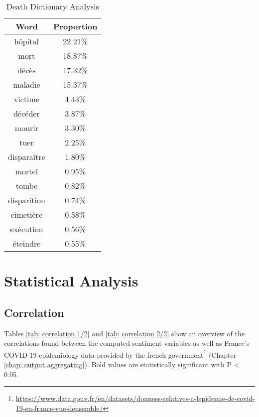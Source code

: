 \begin{table}[]
\caption{Death Dictionary Analysis}
\label{tab:death freqs}
\centering
\begin{tabular}{@{}cc@{}}
\toprule
Word      & Proportion \\ \midrule
hôpital     & 22.21\% \\
mort        & 18.87\% \\
décès       & 17.32\% \\
maladie     & 15.37\% \\
victime     & 4.43\%  \\
décéder     & 3.87\%  \\
mourir      & 3.30\%  \\
tuer        & 2.25\%  \\
disparaître & 1.80\%  \\
mortel      & 0.95\%  \\
tombe       & 0.82\%  \\
disparition & 0.74\%  \\
cimetière   & 0.58\%  \\
exécution   & 0.56\%  \\
éteindre    & 0.55\%  \\ \bottomrule
\end{tabular}
\end{table}

\section{Statistical Analysis}

\subsection{Correlation}

Tables \ref{tab: correlation 1/2} and  \ref{tab: correlation 2/2} show an overview of the correlations found between the computed sentiment variables as well as France's COVID-19 epidemiology data provided by the french government\footnote{\url{https://www.data.gouv.fr/en/datasets/donnees-relatives-a-lepidemie-de-covid-19-en-france-vue-densemble/}} (Chapter \ref{chap: output aggregating}). Bold values are statistically significant with P < 0.05.

